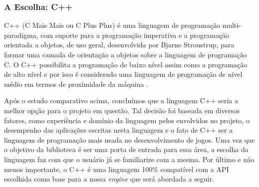 \subsubsection{A Escolha: C++}
%
C++ (C Mais Mais ou C Plus Plus) é uma linguagem de programação multi-paradigma, com suporte para a programação imperativa e a programação orientada a objetos, de uso geral, desenvolvida por Bjarne Stroustrup, para formar uma camada de orientação a objetos sobre a linguagem de programação C. O C++ possibilita a programação de baixo nível assim como a programação de alto nível e por isso é considerado uma linguagem de programação de nível médio em termos de proximidade da máquina \cite{Mizrahi} .
\par
Após o estudo comparativo acima, concluímos que a linguagem C++ seria a melhor opção para o projeto em questão. Tal decisão foi baseada em diversos fatores, como experiência e domínio da linguagem pelos envolvidos no projeto, o desempenho das aplicações escritas nesta linguagem e o fato de C++ ser a linguagem de programação mais usada no desenvolvimento de jogos. Uma vez que o objetivo da biblioteca é ser uma porta de entrada para essa área, a escolha da linguagem faz com que o usuário já se familiarize com a mesma. Por último e não menos importante, o C++ é uma linguagem 100\% compatível com a API escolhida como base para a nossa \textit{engine} que será abordada a seguir.
%
%
